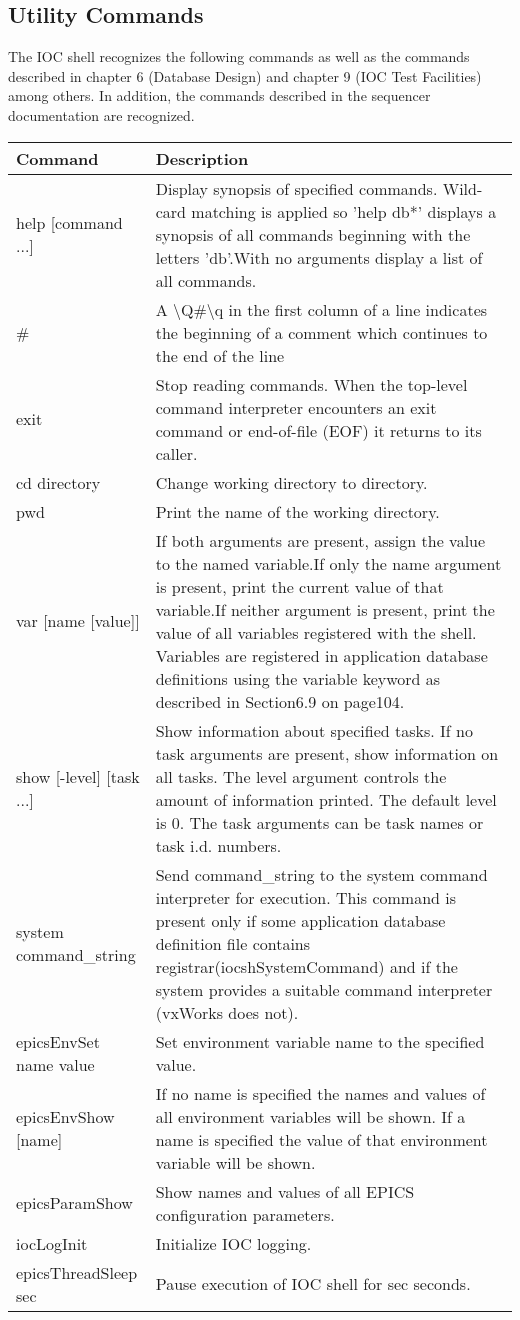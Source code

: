 \subsection{Utility Commands}

The IOC shell recognizes the following commands as well as the commands described in chapter 6 (Database Design) and 
chapter 9 (IOC Test Facilities) among others.  In addition, the commands described in the sequencer documentation are 
recognized.
\begin{center}\begin{longtable}{p{1.59082in}p{5.21418in}}
Command & Description\\
\hline
help [command ...] & Display synopsis of specified commands.  Wild-card matching is applied so 'help db*' displays a synopsis of all commands beginning with the letters 'db'.With no arguments display a list of all commands.\\
\# & A \textbackslash{}Q\#\textbackslash{}q in the first column of a line indicates the beginning of a comment which continues to the end of the line\\
exit & Stop reading commands. When the top-level command interpreter encounters an exit command or end-of-file (EOF) it returns to its caller.\\
cd directory & Change working directory to directory.\\
pwd & Print the name of the working directory.\\
var [name [value]] & If both arguments are present, assign the value to the named variable.If only the name argument is present, print the current value of that variable.If neither argument is present, print the value of all variables registered with the shell.  Variables are registered in application database definitions using the variable keyword as described in Section6.9 on page104.\\
show [-level] [task ...] & Show information about specified tasks.  If no task arguments are present, show information on all tasks.  The level argument controls the amount of information printed.  The default level is 0.  The task arguments can be task names or task i.d. numbers.\\
system command\_string & Send command\_string to the system command interpreter for execution.  This command is present only if some application database definition file contains registrar(iocshSystemCommand) and if the system provides a suitable command interpreter (vxWorks does not).\\
epicsEnvSet name value & Set environment variable name to the specified value.\\
epicsEnvShow  [name] & If no name is specified the names and values of all environment variables will be shown. If a name is specified the value of that environment variable will be shown.\\
epicsParamShow & Show names and values of all EPICS configuration parameters.\\
iocLogInit & Initialize IOC logging.\\
epicsThreadSleep sec & Pause execution of IOC shell for sec seconds.
\end{longtable}\end{center}


